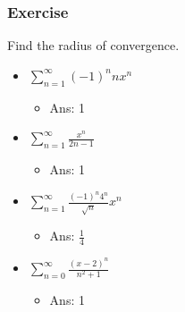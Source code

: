 \documentclass[t]{beamer}
\theoremstyle{plain}
\theoremstyle{definition}
\begin{document}
\begin{frame}

\frametitle{Exercise}

Find the radius of convergence.

\begin{itemize}
	\item $\displaystyle\sum_{n=1}^{\infty} (-1)^n nx^n$  %
	\begin{itemize}
		\item Ans: 1
	\end{itemize}
	\item $\displaystyle\sum_{n=1}^{\infty} \frac{x^n}{2n-1}$  %
	\begin{itemize}
		\item Ans: 1
	\end{itemize}
	\item $\displaystyle\sum_{n=1}^{\infty} \frac{(-1)^n 4^n}{\sqrt{n}}x^n$  %
	\begin{itemize}
		\item Ans: $\frac{1}{4}$
	\end{itemize}
	\item $\displaystyle\sum_{n=0}^{\infty} \frac{(x - 2)^n}{n^2 + 1}$  %
	\begin{itemize}
		\item Ans: 1
	\end{itemize}

\end{itemize}

\end{frame}
\end{document}
